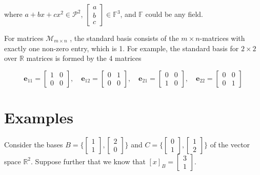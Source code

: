 \documentclass[11pt, oneside]{article}   	%
\begin{document}
\bigskip
\noindent
where $a +bx +cx^2 \in  \mathcal{P}^2$, $\begin{bmatrix} a \\ b \\ c \end{bmatrix}  \in \mathbb{F}^3$, and $\mathbb{F}$ could be any field.


\bigskip
\noindent
For matrices $\mathcal {M}_{m \times n}$ , the standard basis consists of the $m \times n$-matrices with exactly one 
non-zero entry, which is 1.  For example, the standard basis for $2 \times 2$ over $\mathbb{R}$ matrices is formed by the 4 matrices

\bigskip
\begin{equation*}
\mathbf{e}_{11} = \begin{bmatrix}1&0\\0&0 \end{bmatrix}, \quad \mathbf{e}_{12} = \begin{bmatrix} 0&1\\0&0 \end{bmatrix},\quad
\mathbf{e}_{21} = \begin{bmatrix}0&0\\1&0\end{bmatrix},\quad \mathbf{e}_{22} = \begin{bmatrix}0&0\\0&1\end{bmatrix}
\end{equation*}

\bigskip
\section{Examples}
Consider the bases $B = \Bigg \{\begin{bmatrix}  1 \\ 1\end{bmatrix}, \begin{bmatrix} 2 \\ 0 \end{bmatrix} \Bigg \}$ and
$C = \Bigg \{\begin{bmatrix}  0 \\ 1\end{bmatrix}, \begin{bmatrix} 1 \\ 2 \end{bmatrix} \Bigg \}$ of the vector space $\mathbb{R}^2$. Suppose 
further that we know that $[x]_B = \begin{bmatrix}  3 \\ 1 \end{bmatrix}$.
\end{document}
